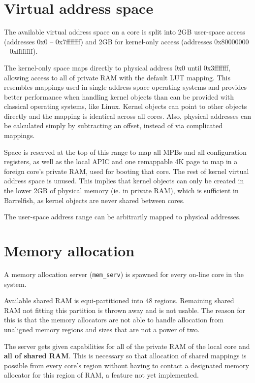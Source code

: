 \documentclass[a4paper,twoside]{report} %
\begin{document}
\section{Virtual address space}

The available virtual address space on a core is split into 2GB
user-space access (addresses 0x0 -- 0x7fffffff) and 2GB for
kernel-only access (addresses 0x80000000 -- 0xffffffff).

The kernel-only space maps directly to physical address 0x0 until
0x3fffffff, allowing access to all of private RAM with the default LUT
mapping. This resembles mappings used in single address space
operating systems and provides better performance when handling kernel
objects than can be provided with classical operating systems, like
Linux. Kernel objects can point to other objects directly and the
mapping is identical across all cores. Also, physical addresses can be
calculated simply by subtracting an offset, instead of via complicated
mappings.

Space is reserved at the top of this range to map all MPBs and all
configuration registers, as well as the local APIC and one remappable
4K page to map in a foreign core's private RAM, used for booting that
core.  The rest of kernel virtual address space is unused. This
implies that kernel objects can only be created in the lower 2GB of
physical memory (ie. in private RAM), which is sufficient in
Barrelfish, as kernel objects are never shared between cores.

The user-space address range can be arbitrarily mapped to physical
addresses.

\section{Memory allocation}

A memory allocation server (\texttt{mem\_serv}) is spawned for every
on-line core in the system.

Available shared RAM is equi-partitioned into 48 regions. Remaining
shared RAM not fitting this partition is thrown away and is not
usable. The reason for this is that the memory allocators are not able
to handle allocation from unaligned memory regions and sizes that are
not a power of two.

The server gets given capabilities for all of the private RAM of the
local core and \textbf{all of shared RAM}. This is necessary so that
allocation of shared mappings is possible from every core's region
without having to contact a designated memory allocator for this
region of RAM, a feature not yet implemented.
\end{document}
